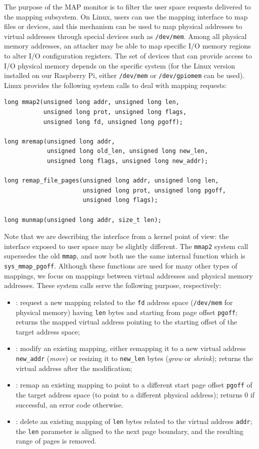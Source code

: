 The purpose of the MAP monitor is to filter the user space requests delivered to the mapping subsystem. On Linux, users can use the mapping interface to
map files or devices, and this mechanism can be used to map physical addresses to virtual addresses through special devices such as \verb|/dev/mem|.
Among all physical memory addresses, an attacker may be able to map specific I/O memory regions to alter I/O configuration registers.
The set of devices that can provide access to I/O physical memory depends on the specific system
(\eg for the Linux version installed on our Raspberry Pi, either \verb|/dev/mem| or \verb|/dev/gpiomem| can be used).
Linux provides the following system calls to deal with mapping requests:
\begin{lstlisting}
long mmap2(unsigned long addr, unsigned long len,
           unsigned long prot, unsigned long flags,
           unsigned long fd, unsigned long pgoff);

long mremap(unsigned long addr,
            unsigned long old_len, unsigned long new_len,
            unsigned long flags, unsigned long new_addr);

long remap_file_pages(unsigned long addr, unsigned long len,
                      unsigned long prot, unsigned long pgoff,
                      unsigned long flags);

long munmap(unsigned long addr, size_t len);
\end{lstlisting}
Note that we are describing the interface from a kernel point of view: the interface exposed to user space may be slightly different.
The \verb|mmap2| system call supersedes the old \verb|mmap|, and now both use the same internal function which is \verb|sys_mmap_pgoff|.
Although these functions are used for many other types of mappings, we focus on mappings between virtual addresses and physical memory addresses.
These system calls serve the following purpose, respectively:
\begin{itemize}
	\item {}: request a new mapping related to the \verb|fd| address space (\eg \verb|/dev/mem| for physical memory) having \verb|len| bytes
		and starting from page offset \verb|pgoff|; returns the mapped virtual address pointing to the starting offset of the target address space;
	\item {}: modify an existing mapping, either remapping it to a new virtual address \verb|new_addr| (\emph{move})
		or resizing it to \verb|new_len| bytes (\emph{grow} or \emph{shrink}); returns the virtual address after the modification;
	\item {}: remap an existing mapping to point to a different start page offset \verb|pgoff| of the target address space
		(\eg to point to a different physical address); returns $0$ if successful, an error code otherwise.
	\item {}: delete an existing mapping of \verb|len| bytes related to the virtual address \verb|addr|;
		the \verb|len| parameter is aligned to the next page boundary, and the resulting range of pages is removed.
\end{itemize}
